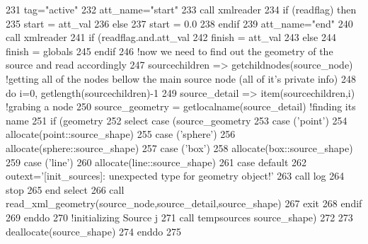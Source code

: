 \begin{DoxyCode}
231         tag=\textcolor{stringliteral}{"active"}
232         att\_name=\textcolor{stringliteral}{"start"}
233         \textcolor{keyword}{call }xmlreader%
234         \textcolor{keywordflow}{if} (readflag) \textcolor{keywordflow}{then}
235             start = att\_val%
236         \textcolor{keywordflow}{else}
237             start = 0.0
238 \textcolor{keywordflow}{        endif}
239         att\_name=\textcolor{stringliteral}{"end"}
240         \textcolor{keyword}{call }xmlreader%
241         \textcolor{keywordflow}{if} (readflag.and.att\_val%
242             finish = att\_val%
243         \textcolor{keywordflow}{else}
244             finish = globals%
245 \textcolor{keywordflow}{        endif}
246         \textcolor{comment}{!now we need to find out the geometry of the source and read accordingly}
247         sourcechildren => getchildnodes(source\_node) \textcolor{comment}{!getting all of the nodes bellow the main source node
       (all of it's private info)}
248         \textcolor{keywordflow}{do} i=0, getlength(sourcechildren)-1
249             source\_detail => item(sourcechildren,i) \textcolor{comment}{!grabing a node}
250             source\_geometry = getlocalname(source\_detail)  \textcolor{comment}{!finding its name}
251             \textcolor{keywordflow}{if} (geometry%
252                 \textcolor{keywordflow}{select case} (source\_geometry%
253                 \textcolor{keywordflow}{case} (\textcolor{stringliteral}{'point'})
254                     \textcolor{keyword}{allocate}(point::source\_shape)
255                 \textcolor{keywordflow}{case} (\textcolor{stringliteral}{'sphere'})
256                     \textcolor{keyword}{allocate}(sphere::source\_shape)
257                 \textcolor{keywordflow}{case} (\textcolor{stringliteral}{'box'})
258                     \textcolor{keyword}{allocate}(box::source\_shape)
259                 \textcolor{keywordflow}{case} (\textcolor{stringliteral}{'line'})
260                     \textcolor{keyword}{allocate}(line::source\_shape)
261 \textcolor{keywordflow}{                    case default}
262                     outext=\textcolor{stringliteral}{'[init\_sources]: unexpected type for geometry object!'}
263                     \textcolor{keyword}{call }log%
264                     stop
265 \textcolor{keywordflow}{                end select}
266                 \textcolor{keyword}{call }read\_xml\_geometry(source\_node,source\_detail,source\_shape)
267                 \textcolor{keywordflow}{exit}
268 \textcolor{keywordflow}{            endif}
269 \textcolor{keywordflow}{        enddo}
270         \textcolor{comment}{!initializing Source j       }
271         \textcolor{keyword}{call }tempsources%
      source\_shape)
272 
273         \textcolor{keyword}{deallocate}(source\_shape)
274 \textcolor{keywordflow}{    enddo}
275 
\end{DoxyCode}
